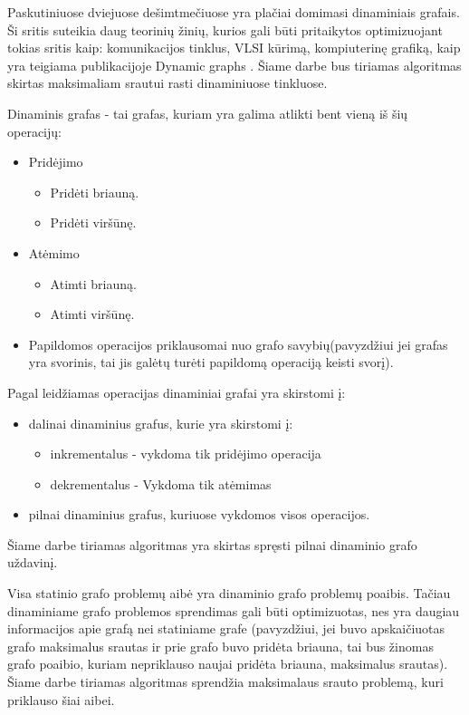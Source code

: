 Paskutiniuose dviejuose dešimtmečiuose yra plačiai domimasi dinaminiais grafais. Ši sritis suteikia daug teorinių žinių, kurios gali būti pritaikytos optimizuojant tokias sritis kaip: komunikacijos tinklus, VLSI kūrimą, kompiuterinę grafiką, kaip yra teigiama publikacijoje Dynamic graphs  \cite{DynamicGraphs}. Šiame darbe bus tiriamas algoritmas skirtas maksimaliam srautui rasti dinaminiuose tinkluose.

Dinaminis grafas - tai grafas, kuriam yra galima atlikti bent vieną iš šių operacijų:
\begin{itemize}
	\item Pridėjimo
	\begin{itemize}
		\item Pridėti briauną.
		\item Pridėti viršūnę.
	\end{itemize}
	\item Atėmimo
	\begin{itemize}
		\item Atimti briauną.
		\item Atimti viršūnę.
	\end{itemize}
	\item  Papildomos operacijos priklausomai nuo grafo savybių(pavyzdžiui jei grafas yra svorinis, tai jis galėtų turėti papildomą operaciją keisti svorį).
\end{itemize}
Pagal leidžiamas operacijas dinaminiai grafai yra skirstomi į:
\begin{itemize}
	\item dalinai dinaminius grafus, kurie yra skirstomi į:
	\begin{itemize}
		\item inkrementalus - vykdoma tik pridėjimo operacija
		\item dekrementalus - Vykdoma tik atėmimas
	\end{itemize}
	\item  pilnai dinaminius grafus, kuriuose vykdomos visos operacijos.
\end{itemize}
Šiame darbe tiriamas algoritmas yra skirtas spręsti pilnai dinaminio grafo uždavinį.

Visa statinio grafo problemų aibė yra dinaminio grafo problemų poaibis. Tačiau dinaminiame grafo problemos sprendimas gali būti optimizuotas, nes yra daugiau informacijos apie grafą nei statiniame grafe (pavyzdžiui, jei buvo apskaičiuotas grafo maksimalus srautas ir prie grafo buvo pridėta briauna, tai bus žinomas grafo poaibio, kuriam nepriklauso naujai pridėta briauna, maksimalus srautas). Šiame darbe tiriamas algoritmas sprendžia maksimalaus srauto problemą, kuri priklauso šiai aibei.

